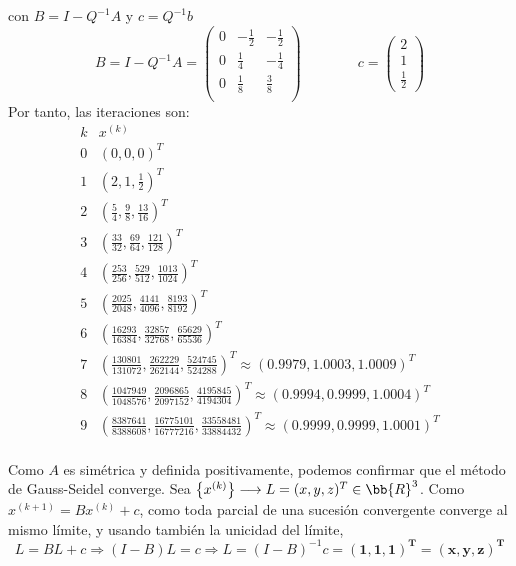\begin{ejercicio}
\begin{enumerate}
        con $B=I-Q^{-1}A$ y $c=Q^{-1}b$
        $$B=I-Q^{-1}A =\left( \begin{array}{ccc}
            0 & -\frac{1}{2} & -\frac{1}{2} \\
            0 & \frac{1}{4} & -\frac{1}{4} \\
            0 & \frac{1}{8} & \frac{3}{8} \\
        \end{array} \right)
        \qquad \qquad
        c=\left( \begin{array}{c}
            2 \\ 1 \\ \frac{1}{2}
        \end{array} \right)$$
        Por tanto, las iteraciones son:
        \begin{equation*}
            \begin{array}{c|l}
                k & x^{(k)} \\ \hline
                0 & \displaystyle(0,0,0)^T \\
                1 & \displaystyle\left(2,1,\frac{1}{2}\right)^T \\
                2 & \displaystyle\left(\frac{5}{4},\frac{9}{8},\frac{13}{16}\right)^T \\
                3 & \displaystyle\left(\frac{33}{32},\frac{69}{64},\frac{121}{128}\right)^T \\
                4 & \displaystyle\left(\frac{253}{256},\frac{529}{512},\frac{1013}{1024}\right)^T \\
                5 & \displaystyle\left(\frac{2025}{2048},\frac{4141}{4096},\frac{8193}{8192}\right)^T \\
                6 & \displaystyle\left(\frac{16293}{16384},\frac{32857}{32768},\frac{65629}{65536}\right)^T \\
                7 & \displaystyle\left(\frac{130801}{131072},\frac{262229}{262144},\frac{524745}{524288}\right)^T  \approx (0.9979,1.0003,1.0009)^T\\
                8 & \displaystyle\left(\frac{1047949}{1048576},\frac{2096865}{2097152},\frac{4195845}{4194304}\right)^T \approx (0.9994,0.9999,1.0004)^T \\
                9 & \displaystyle\left(\frac{8387641}{8388608},\frac{16775101}{16777216},\frac{33558481}{33884432}\right)^T \approx (0.9999,0.9999,1.0001)^T\\
            \end{array}
        \end{equation*}
        \begin{observacion}
            Como $A$ es simétrica y definida positivamente, podemos confirmar que el método de Gauss-Seidel converge.
            Sea $\left\{x^{(k)}\right\}\longrightarrow L=(x,y,z)^T\in \bb{R}^3$. Como $x^{(k+1)}=Bx^{(k)} +c$, como toda parcial de una sucesión convergente converge al mismo límite, y usando también la unicidad del límite,
            $$L=BL + c \Longrightarrow (I-B)L=c \Longrightarrow L=(I-B)^{-1}c = \mathbf{(1,1,1)^T=(x,y,z)^T}$$
        \end{observacion}


\end{enumerate}
\end{ejercicio}

